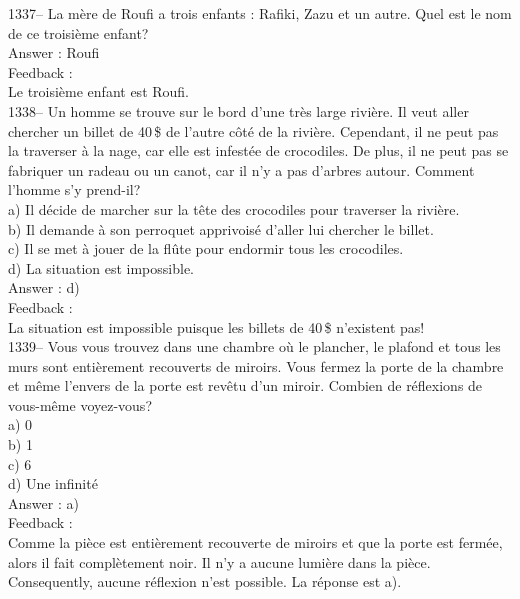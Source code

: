 ﻿\documentclass[letterpaper, 12pt]{article}
\begin{document}
1337-- La m\`ere de Roufi a trois enfants : Rafiki, Zazu et un autre.  Quel
est le nom de ce troisi\`eme enfant?\\

Answer : Roufi\\

Feedback : \\
Le troisi\`eme enfant est Roufi.\\

1338-- Un homme se trouve sur le bord d'une tr\`es large rivi\`ere.  Il veut
aller chercher un billet de 40\,\$ de l'autre c\^ot\'e de la rivi\`ere.
Cependant, il ne peut pas la traverser \`a la nage, car elle est infest\'ee
de crocodiles.  De plus, il ne peut pas se fabriquer un radeau ou un canot,
car il n'y a pas d'arbres autour.  Comment l'homme s'y prend-il?\\
a) Il d\'ecide de marcher sur la t\^ete des crocodiles  pour traverser la
rivi\`ere.\\
b) Il demande \`a son perroquet apprivois\'e d'aller lui chercher le
billet.\\
c) Il se met \`a jouer de la fl\^ute pour endormir tous les crocodiles. \\
d) La situation est impossible.\\

Answer : d)\\

Feedback : \\
La situation est impossible puisque les billets de 40\,\$ n'existent pas! \\

1339-- Vous vous trouvez dans une chambre o\`u le plancher, le plafond et
tous les murs sont enti\`erement recouverts de miroirs.  Vous fermez la
porte de la chambre et m\^eme l'envers de la porte est rev\^etu d'un miroir.
  Combien de r\'eflexions de vous-m\^eme voyez-vous?\\
a) 0\\
b) 1\\
c) 6\\
d) Une infinit\'e\\

Answer : a)\\

Feedback : \\
Comme la pi\`ece est enti\`erement recouverte de miroirs et que la porte est
ferm\'ee, alors il fait compl\`etement noir.  Il n'y a aucune lumi\`ere dans
la pi\`ece.  Consequently, aucune r\'eflexion n'est possible.  La
r\'eponse est a).\\
\end{document}
